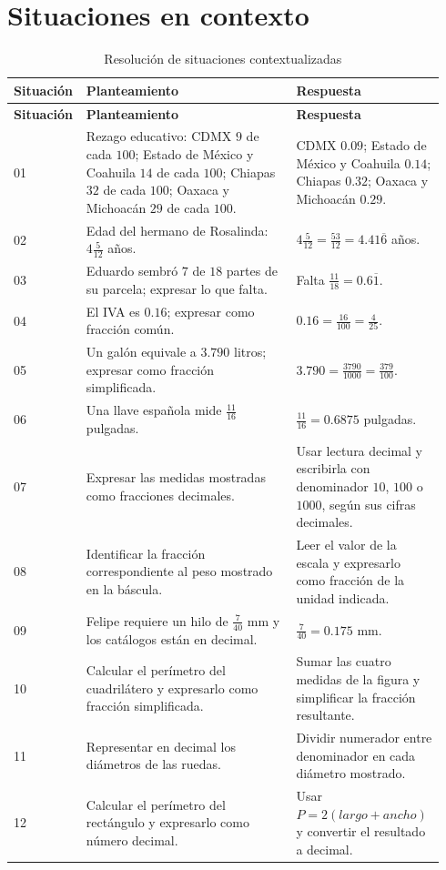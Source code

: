 \documentclass[
	spanish,
	letterpaper, oneside
]{article}
\begin{document}
\section{Situaciones en contexto}

\begin{longtable}{@{}p{0.12\linewidth}p{0.48\linewidth}p{0.34\linewidth}@{}}
	\caption{Resolución de situaciones contextualizadas}\label{tab:situaciones}\\
	\toprule
	\textbf{Situación} & \textbf{Planteamiento} & \textbf{Respuesta} \\
	\midrule
	\endfirsthead
	\toprule
	\textbf{Situación} & \textbf{Planteamiento} & \textbf{Respuesta} \\
	\midrule
	\endhead
	01 & Rezago educativo: CDMX $9$ de cada $100$; Estado de México y Coahuila $14$ de cada $100$; Chiapas $32$ de cada $100$; Oaxaca y Michoacán $29$ de cada $100$. & CDMX $0{.}09$; Estado de México y Coahuila $0{.}14$; Chiapas $0{.}32$; Oaxaca y Michoacán $0{.}29$. \\
	02 & Edad del hermano de Rosalinda: $4\frac{5}{12}$ años. & $4\frac{5}{12}=\frac{53}{12}=4{.}41\overline{6}$ años. \\
	03 & Eduardo sembró $7$ de $18$ partes de su parcela; expresar lo que falta. & Falta $\frac{11}{18}=0{.}6\overline{1}$. \\
	04 & El IVA es $0{.}16$; expresar como fracción común. & $0{.}16=\frac{16}{100}=\frac{4}{25}$. \\
	05 & Un galón equivale a $3{.}790$ litros; expresar como fracción simplificada. & $3{.}790=\frac{3790}{1000}=\frac{379}{100}$. \\
	06 & Una llave española mide $\frac{11}{16}$ pulgadas. & $\frac{11}{16}=0{.}6875$ pulgadas. \\
	07 & Expresar las medidas mostradas como fracciones decimales. & Usar lectura decimal y escribirla con denominador $10$, $100$ o $1000$, según sus cifras decimales. \\
	08 & Identificar la fracción correspondiente al peso mostrado en la báscula. & Leer el valor de la escala y expresarlo como fracción de la unidad indicada. \\
	09 & Felipe requiere un hilo de $\frac{7}{40}$ mm y los catálogos están en decimal. & $\frac{7}{40}=0{.}175$ mm. \\
	10 & Calcular el perímetro del cuadrilátero y expresarlo como fracción simplificada. & Sumar las cuatro medidas de la figura y simplificar la fracción resultante. \\
	11 & Representar en decimal los diámetros de las ruedas. & Dividir numerador entre denominador en cada diámetro mostrado. \\
	12 & Calcular el perímetro del rectángulo y expresarlo como número decimal. & Usar $P=2(largo+ancho)$ y convertir el resultado a decimal. \\
	\bottomrule
\end{longtable}
\end{document}
